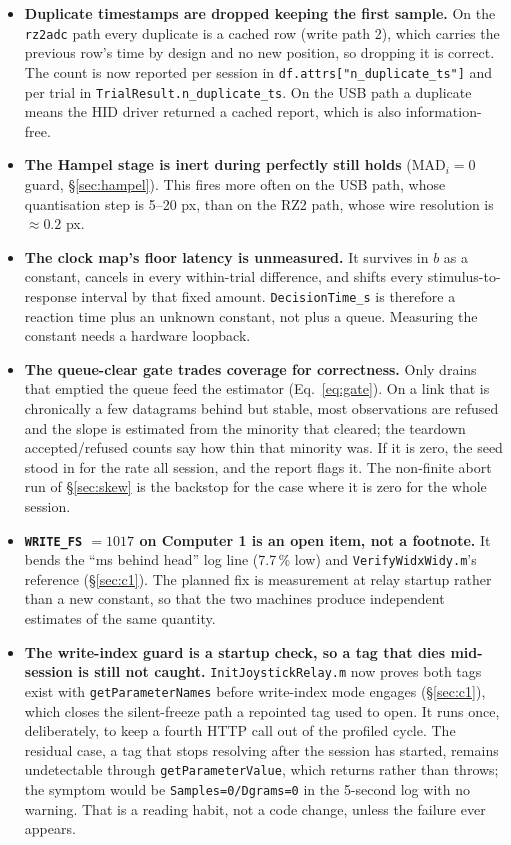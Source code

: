 \documentclass[11pt,a4paper]{article}
\newcommand{\code}[1]{\texttt{\small #1}}
\newcommand{\file}[1]{\texttt{\small #1}}
\begin{document}
\begin{itemize}[leftmargin=*,itemsep=5pt]
\item \textbf{Duplicate timestamps are dropped keeping the first sample.} On the
\code{rz2adc} path every duplicate is a cached row (write path 2), which carries
the previous row's time by design and no new position, so dropping it is
correct. The count is now reported per session in
\code{df.attrs["n\_duplicate\_ts"]} and per trial in
\code{TrialResult.n\_duplicate\_ts}. On the USB path a duplicate means the HID
driver returned a cached report, which is also information-free.

\item \textbf{The Hampel stage is inert during perfectly still holds}
($\mathrm{MAD}_i = 0$ guard, \S\ref{sec:hampel}). This fires more often on the
USB path, whose quantisation step is 5--20 px, than on the RZ2 path, whose wire
resolution is $\approx 0.2$ px.

\item \textbf{The clock map's floor latency is unmeasured.} It survives in $b$
as a constant, cancels in every within-trial difference, and shifts every
stimulus-to-response interval by that fixed amount. \code{DecisionTime\_s} is
therefore a reaction time plus an unknown constant, not plus a queue. Measuring
the constant needs a hardware loopback.

\item \textbf{The queue-clear gate trades coverage for correctness.} Only drains
that emptied the queue feed the estimator (Eq.~\eqref{eq:gate}). On a link that
is chronically a few datagrams behind but stable, most observations are refused
and the slope is estimated from the minority that cleared; the teardown
accepted/refused counts say how thin that minority was. If it is zero, the seed
stood in for the rate all session, and the report flags it. The non-finite abort
run of \S\ref{sec:skew} is the backstop for the case where it is zero for the
whole session.

\item \textbf{\code{WRITE\_FS} $= 1017$ on Computer 1 is an open item, not a
footnote.} It bends the ``ms behind head'' log line (7.7\,\% low) and
\file{VerifyWidxWidy.m}'s reference (\S\ref{sec:c1}). The planned fix is
measurement at relay startup rather than a new constant, so that the two
machines produce independent estimates of the same quantity.

\item \textbf{The write-index guard is a startup check, so a tag that dies
mid-session is still not caught.} \file{InitJoystickRelay.m} now proves both
tags exist with \code{getParameterNames} before write-index mode engages
(\S\ref{sec:c1}), which closes the silent-freeze path a repointed tag used to
open. It runs once, deliberately, to keep a fourth HTTP call out of the profiled
cycle. The residual case, a tag that stops resolving after the session has
started, remains undetectable through \code{getParameterValue}, which returns
rather than throws; the symptom would be \code{Samples=0/Dgrams=0} in the
5-second log with no warning. That is a reading habit, not a code change, unless
the failure ever appears.


\end{itemize}
\end{document}
